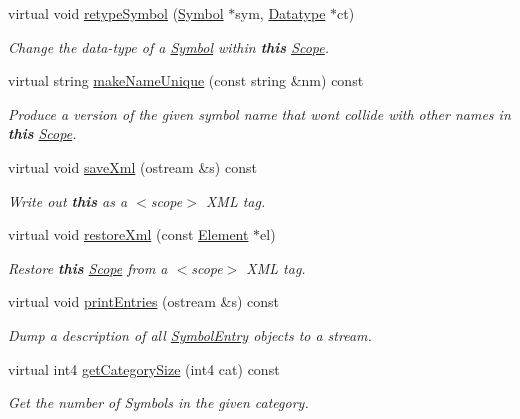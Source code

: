 \begin{DoxyCompactItemize}
virtual void \mbox{\hyperlink{class_scope_ghidra_a086054a08a1916c410fa10b3e8afca76}{retype\+Symbol}} (\mbox{\hyperlink{class_symbol}{Symbol}} $\ast$sym, \mbox{\hyperlink{class_datatype}{Datatype}} $\ast$ct)
\begin{DoxyCompactList}\small\item\em Change the data-\/type of a \mbox{\hyperlink{class_symbol}{Symbol}} within {\bfseries{this}} \mbox{\hyperlink{class_scope}{Scope}}. \end{DoxyCompactList}\item 
virtual string \mbox{\hyperlink{class_scope_ghidra_a458977d1e0a9826d5cf7bca487ecf327}{make\+Name\+Unique}} (const string \&nm) const
\begin{DoxyCompactList}\small\item\em Produce a version of the given symbol name that won\textquotesingle{}t collide with other names in {\bfseries{this}} \mbox{\hyperlink{class_scope}{Scope}}. \end{DoxyCompactList}\item 
virtual void \mbox{\hyperlink{class_scope_ghidra_abb73fa9a07b114dfa8994423f2aae170}{save\+Xml}} (ostream \&s) const
\begin{DoxyCompactList}\small\item\em Write out {\bfseries{this}} as a $<$scope$>$ X\+ML tag. \end{DoxyCompactList}\item 
virtual void \mbox{\hyperlink{class_scope_ghidra_ad6efdd1eb3b3189dc6020a0440128be3}{restore\+Xml}} (const \mbox{\hyperlink{class_element}{Element}} $\ast$el)
\begin{DoxyCompactList}\small\item\em Restore {\bfseries{this}} \mbox{\hyperlink{class_scope}{Scope}} from a $<$scope$>$ X\+ML tag. \end{DoxyCompactList}\item 
virtual void \mbox{\hyperlink{class_scope_ghidra_a6d3865ed7c8917f5f1594f4dd63ade7a}{print\+Entries}} (ostream \&s) const
\begin{DoxyCompactList}\small\item\em Dump a description of all \mbox{\hyperlink{class_symbol_entry}{Symbol\+Entry}} objects to a stream. \end{DoxyCompactList}\item 
virtual int4 \mbox{\hyperlink{class_scope_ghidra_a4c6c26ca7dd639659313e8fe86d798c8}{get\+Category\+Size}} (int4 cat) const
\begin{DoxyCompactList}\small\item\em Get the number of Symbols in the given category. \end{DoxyCompactList}\item 

\end{DoxyCompactItemize}
